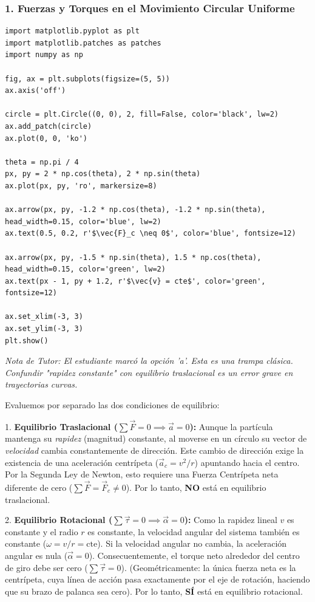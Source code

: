 \documentclass[12pt, a4paper]{article}
\begin{document}
\subsubsection*{1. Fuerzas y Torques en el Movimiento Circular Uniforme}


\begin{verbatim}
import matplotlib.pyplot as plt
import matplotlib.patches as patches
import numpy as np

fig, ax = plt.subplots(figsize=(5, 5))
ax.axis('off')

circle = plt.Circle((0, 0), 2, fill=False, color='black', lw=2)
ax.add_patch(circle)
ax.plot(0, 0, 'ko')

theta = np.pi / 4
px, py = 2 * np.cos(theta), 2 * np.sin(theta)
ax.plot(px, py, 'ro', markersize=8)

ax.arrow(px, py, -1.2 * np.cos(theta), -1.2 * np.sin(theta), head_width=0.15, color='blue', lw=2)
ax.text(0.5, 0.2, r'$\vec{F}_c \neq 0$', color='blue', fontsize=12)

ax.arrow(px, py, -1.5 * np.sin(theta), 1.5 * np.cos(theta), head_width=0.15, color='green', lw=2)
ax.text(px - 1, py + 1.2, r'$\vec{v} = cte$', color='green', fontsize=12)

ax.set_xlim(-3, 3)
ax.set_ylim(-3, 3)
plt.show()
\end{verbatim}

\textit{Nota de Tutor: El estudiante marcó la opción 'a'. Esta es una trampa clásica. Confundir "rapidez constante" con equilibrio traslacional es un error grave en trayectorias curvas.}

Evaluemos por separado las dos condiciones de equilibrio:

1. \textbf{Equilibrio Traslacional ($\sum \vec{F} = 0 \implies \vec{a} = 0$):} 
Aunque la partícula mantenga su \textit{rapidez} (magnitud) constante, al moverse en un círculo su vector de \textit{velocidad} cambia constantemente de dirección. Este cambio de dirección exige la existencia de una aceleración centrípeta ($\vec{a}_c = v^2/r$) apuntando hacia el centro. Por la Segunda Ley de Newton, esto requiere una Fuerza Centrípeta neta diferente de cero ($\sum \vec{F} = \vec{F}_c \neq 0$). 
Por lo tanto, \textbf{NO} está en equilibrio traslacional.

2. \textbf{Equilibrio Rotacional ($\sum \vec{\tau} = 0 \implies \vec{\alpha} = 0$):}
Como la rapidez lineal $v$ es constante y el radio $r$ es constante, la velocidad angular del sistema también es constante ($\omega = v/r = \text{cte}$).
Si la velocidad angular no cambia, la aceleración angular es nula ($\vec{\alpha} = 0$). Consecuentemente, el torque neto alrededor del centro de giro debe ser cero ($\sum \vec{\tau} = 0$). 
(Geométricamente: la única fuerza neta es la centrípeta, cuya línea de acción pasa exactamente por el eje de rotación, haciendo que su brazo de palanca sea cero).
Por lo tanto, \textbf{SÍ} está en equilibrio rotacional.
\end{document}
